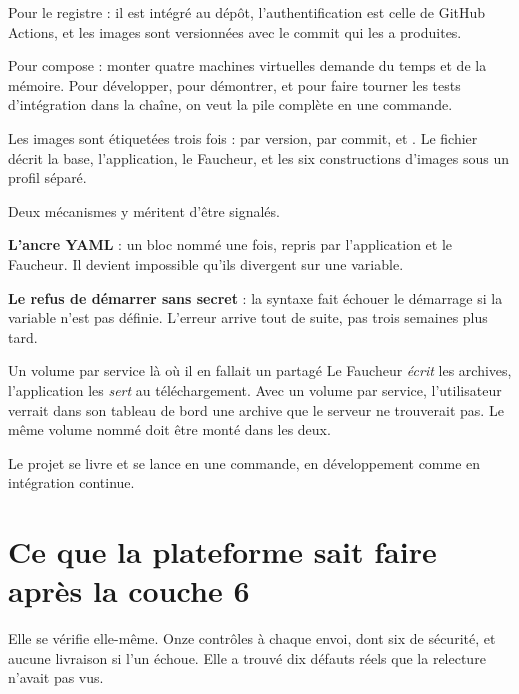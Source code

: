 \pourquoi
Pour le registre : il est intégré au dépôt, l'authentification est celle de
GitHub Actions, et les images sont versionnées avec le commit qui les a
produites.

Pour compose : monter quatre machines virtuelles demande du temps et de la
mémoire. Pour développer, pour démontrer, et pour faire tourner les tests
d'intégration dans la chaîne, on veut la pile complète en une commande.

\role
Les images sont étiquetées trois fois : par version, par commit, et
. Le fichier  décrit la base,
l'application, le Faucheur, et les six constructions d'images sous un profil
séparé.

Deux mécanismes y méritent d'être signalés.

\textbf{L'ancre YAML} : un bloc nommé une fois, repris par l'application et le
Faucheur. Il devient impossible qu'ils divergent sur une variable.

\textbf{Le refus de démarrer sans secret} : la syntaxe
 fait échouer le démarrage si la
variable n'est pas définie. L'erreur arrive tout de suite, pas trois semaines
plus tard.

\begin{piege}{Un volume par service là où il en fallait un partagé}
Le Faucheur \emph{écrit} les archives, l'application les \emph{sert} au
téléchargement. Avec un volume par service, l'utilisateur verrait dans son
tableau de bord une archive que le serveur ne trouverait pas. Le même volume
nommé doit être monté dans les deux.
\end{piege}


\apport
Le projet se livre et se lance en une commande, en développement comme en
intégration continue.

\section*{Ce que la plateforme sait faire après la couche 6}

Elle se vérifie elle-même. Onze contrôles à chaque envoi, dont six de sécurité,
et aucune livraison si l'un échoue. Elle a trouvé dix défauts réels que la
relecture n'avait pas vus.
